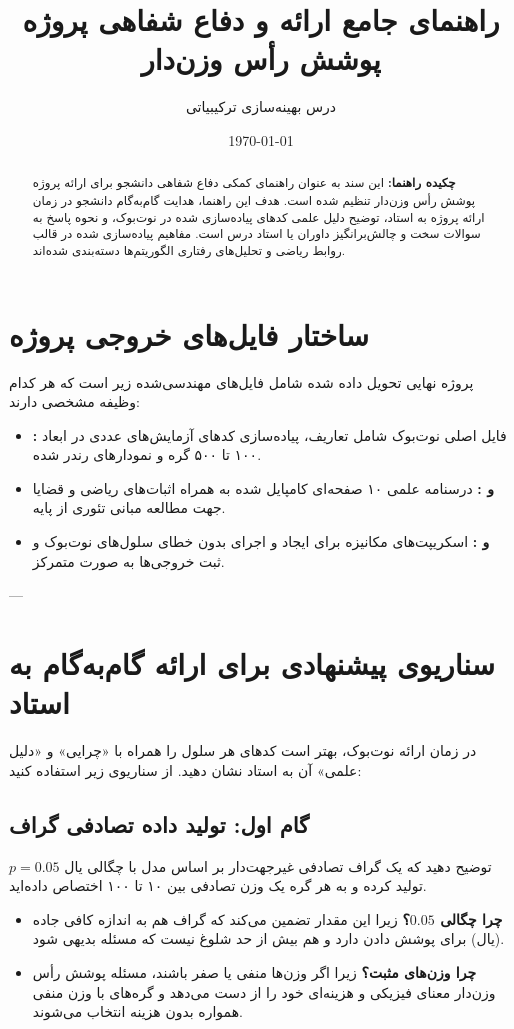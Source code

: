 \documentclass[12pt,a4paper]{article}
\title{\textbf{راهنمای جامع ارائه و دفاع شفاهی پروژه پوشش رأس وزن‌دار \lr{(Weighted Vertex Cover)}}}
\author{درس بهینه‌سازی ترکیبیاتی}
\date{\today}
\begin{document}
\maketitle

\begin{abstract}
\textbf{چکیده راهنما:} 
این سند به عنوان راهنمای کمکی دفاع شفاهی دانشجو برای ارائه پروژه پوشش رأس وزن‌دار  تنظیم شده است. هدف این راهنما، هدایت گام‌به‌گام دانشجو در زمان ارائه پروژه به استاد، توضیح دلیل علمی کدهای پیاده‌سازی شده در نوت‌بوک، و نحوه پاسخ به سوالات سخت و چالش‌برانگیز داوران یا استاد درس است. مفاهیم پیاده‌سازی شده در قالب روابط ریاضی و تحلیل‌های رفتاری الگوریتم‌ها دسته‌بندی شده‌اند.
\end{abstract}

\newpage
\tableofcontents
\newpage

\section{ساختار فایل‌های خروجی پروژه}

پروژه نهایی تحویل داده شده شامل فایل‌های مهندسی‌شده زیر است که هر کدام وظیفه مشخصی دارند:
\begin{itemize}
    \item \textbf{:} فایل اصلی نوت‌بوک شامل تعاریف، پیاده‌سازی کدهای آزمایش‌های عددی در ابعاد ۱۰۰ تا ۵۰۰ گره و نمودارهای رندر شده.
    \item \textbf{ و :} درسنامه علمی ۱۰ صفحه‌ای کامپایل شده به همراه اثبات‌های ریاضی و قضایا جهت مطالعه مبانی تئوری از پایه.
    \item \textbf{ و :} اسکریپت‌های مکانیزه برای ایجاد و اجرای بدون خطای سلول‌های نوت‌بوک و ثبت خروجی‌ها به صورت متمرکز.
\end{itemize}

---

\section{سناریوی پیشنهادی برای ارائه گام‌به‌گام به استاد}

در زمان ارائه نوت‌بوک، بهتر است کدهای هر سلول را همراه با «چرایی» و «دلیل علمی» آن به استاد نشان دهید. از سناریوی زیر استفاده کنید:

\subsection{گام اول: تولید داده تصادفی گراف}
توضیح دهید که یک گراف تصادفی غیرجهت‌دار بر اساس مدل  با چگالی یال $p=0.05$ تولید کرده و به هر گره یک وزن تصادفی بین ۱۰ تا ۱۰۰ اختصاص داده‌اید.
\begin{itemize}
    \item \textbf{چرا چگالی $0.05$؟} زیرا این مقدار تضمین می‌کند که گراف هم به اندازه کافی جاده (یال) برای پوشش دادن دارد و هم بیش از حد شلوغ نیست که مسئله بدیهی شود.
    \item \textbf{چرا وزن‌های مثبت؟} زیرا اگر وزن‌ها منفی یا صفر باشند، مسئله پوشش رأس وزن‌دار معنای فیزیکی و هزینه‌ای خود را از دست می‌دهد و گره‌های با وزن منفی همواره بدون هزینه انتخاب می‌شوند.
\end{itemize}
\end{document}

